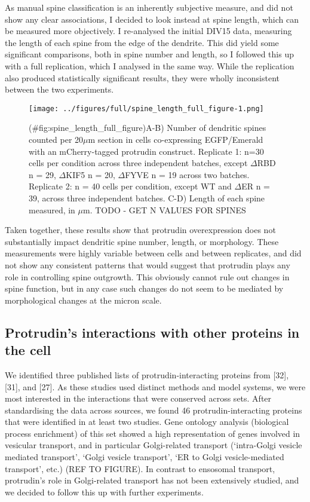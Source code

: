 \documentclass[
  12pt,
  a4paper,
]{book}
\begin{document}
As manual spine classification is an inherently subjective measure, and did not show any clear associations, I decided to look instead at spine length, which can be measured more objectively. I re-analysed the initial DIV15 data, measuring the length of each spine from the edge of the dendrite. This did yield some significant comparisons, both in spine number and length, so I followed this up with a full replication, which I analysed in the same way. While the replication also produced statistically significant results, they were wholly inconsistent between the two experiments.

\begin{figure}
\centering
\texttt{[image: ../figures/full/spine\_length\_full\_figure-1.png]}
\caption{(\#fig:spine\_length\_full\_figure)A-B) Number of dendritic spines counted per 20\(\mu\)m section in cells co-expressing EGFP/Emerald with an mCherry-tagged protrudin construct. Replicate 1: n=30 cells per condition across three independent batches, except \(\Delta\)RBD n = 29, \(\Delta\)KIF5 n = 20, \(\Delta\)FYVE n = 19 across two batches. Replicate 2: n = 40 cells per condition, except WT and \(\Delta\)ER n = 39, across three independent batches. C-D) Length of each spine measured, in \(\mu\)m. TODO - GET N VALUES FOR SPINES}
\end{figure}

Taken together, these results show that protrudin overexpression does not substantially impact dendritic spine number, length, or morphology. These measurements were highly variable between cells and between replicates, and did not show any consistent patterns that would suggest that protrudin plays any role in controlling spine outgrowth. This obviously cannot rule out changes in spine function, but in any case such changes do not seem to be mediated by morphological changes at the micron scale.

\hypertarget{protrudins-interactions-with-other-proteins-in-the-cell}{%
\subsection{Protrudin's interactions with other proteins in the cell}\label{protrudins-interactions-with-other-proteins-in-the-cell}}

We identified three published lists of protrudin-interacting proteins from {[}32{]}, {[}31{]}, and {[}27{]}. As these studies used distinct methods and model systems, we were most interested in the interactions that were conserved across sets. After standardising the data across sources, we found 46 protrudin-interacting proteins that were identified in at least two studies. Gene ontology analysis (biological process enrichment) of this set showed a high representation of genes involved in vesicular transport, and in particular Golgi-related transport (`intra-Golgi vesicle mediated transport', `Golgi vesicle transport', `ER to Golgi vesicle-mediated transport', etc.) (REF TO FIGURE). In contrast to ensosomal transport, protrudin's role in Golgi-related transport has not been extensively studied, and we decided to follow this up with further experiments.
\end{document}
